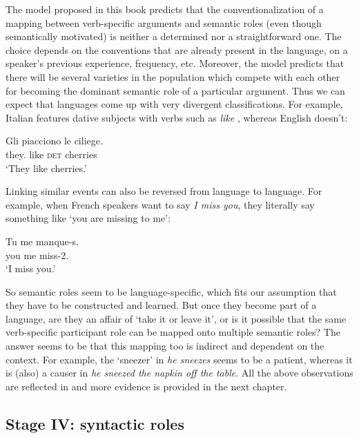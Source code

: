 The model proposed in this book predicts that the conventionalization of a mapping between verb-specific arguments and semantic roles (even though semantically motivated) is neither a determined nor a straightforward one. The choice depends on the conventions that are already present in the language, on a speaker's previous experience, frequency, etc. Moreover, the model predicts that there will be several varieties in the population which compete with each other for becoming the dominant semantic role of a particular argument. Thus we can expect that languages come up with very divergent classifications. For example, Italian features dative subjects with verbs such as {\em like} \citep[27]{palmer94grammatical}, whereas English doesn't:

\ea
\gll Gli piacciono le ciliege. \\
they.{\dat} like \textsc{det} cherries \\
\glt `They like cherries.'  \\
\z


Linking similar events can also be reversed from language to language. For example, when French speakers want to say {\em I miss you}, they literally say something like `you are missing to me':

\ea
\gll Tu me manque-s. \\
you me miss-2{\sg}.{\prs} \\
\glt `I miss you.' \\
\z


So semantic roles seem to be language-specific, which fits our assumption that they have to be constructed and learned. But once they become part of a language, are they an affair of `take it or leave it', or is it possible that the same verb-specific participant role can be mapped onto multiple semantic roles? The answer seems to be that this mapping too is indirect and dependent on the context. For example, the `sneezer' in {\em he sneezes} seems to be a patient, whereas it is (also) a causer in {\em he sneezed the napkin off the table}. All the above observations are reflected in  and more evidence is provided in the next chapter.

\subsection{Stage IV: syntactic roles}
\label{s:stage4}

